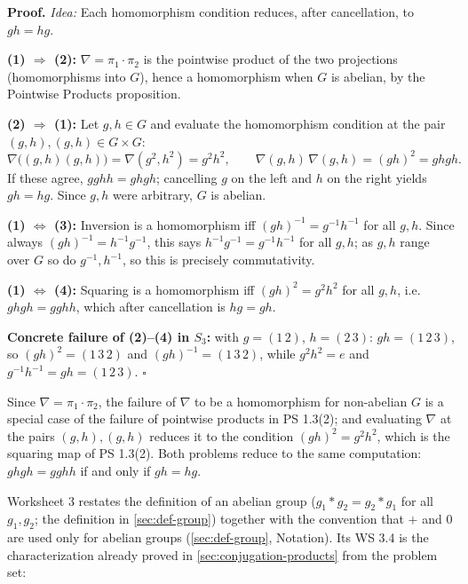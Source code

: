 \documentclass[11pt]{report}
\renewenvironment{proof}[1][Proof]{\noindent\textbf{#1.} }{\hfill$\square$\par\vspace{5pt}}
\begin{document}
\begin{proof}
\textit{Idea:} Each homomorphism condition reduces, after cancellation, to $gh = hg$.\par
\textbf{(1) $\Rightarrow$ (2):} $\nabla = \pi_1 \cdot \pi_2$ is the pointwise product of the two projections (homomorphisms into $G$), hence a homomorphism when $G$ is abelian, by the Pointwise Products proposition.

\textbf{(2) $\Rightarrow$ (1):} Let $g, h \in G$ and evaluate the homomorphism condition at the pair $(g, h), (g, h) \in G \times G$:
\[ \nabla\big((g,h)(g,h)\big) = \nabla(g^2, h^2) = g^2 h^2, \qquad \nabla(g,h)\,\nabla(g,h) = (gh)^2 = ghgh. \]
If these agree, $gghh = ghgh$; cancelling $g$ on the left and $h$ on the right yields $gh = hg$. Since $g, h$ were arbitrary, $G$ is abelian.

\textbf{(1) $\Leftrightarrow$ (3):} Inversion is a homomorphism iff $(gh)^{-1} = g^{-1} h^{-1}$ for all $g, h$. Since always $(gh)^{-1} = h^{-1} g^{-1}$, this says $h^{-1} g^{-1} = g^{-1} h^{-1}$ for all $g, h$; as $g, h$ range over $G$ so do $g^{-1}, h^{-1}$, so this is precisely commutativity.

\textbf{(1) $\Leftrightarrow$ (4):} Squaring is a homomorphism iff $(gh)^2 = g^2 h^2$ for all $g, h$, i.e.\ $ghgh = gghh$, which after cancellation is $hg = gh$.

\textbf{Concrete failure of (2)--(4) in $S_3$:} with $g = (1\,2)$, $h = (2\,3)$: $gh = (1\,2\,3)$, so $(gh)^2 = (1\,3\,2)$ and $(gh)^{-1} = (1\,3\,2)$, while $g^2h^2 = e$ and $g^{-1}h^{-1} = gh = (1\,2\,3)$.
\end{proof}

\begin{rembox}\label{rem:relation-between-ps-1-3-2-ps-1-4-3}
Since $\nabla = \pi_1 \cdot \pi_2$, the failure of $\nabla$ to be a homomorphism for non-abelian $G$ is a special case of the failure of pointwise products in PS 1.3(2); and evaluating $\nabla$ at the pairs $(g,h), (g,h)$ reduces it to the condition $(gh)^2 = g^2 h^2$, which is the squaring map of PS 1.3(2). Both problems reduce to the same computation: $ghgh = gghh$ if and only if $gh = hg$.
\end{rembox}


Worksheet 3 restates the definition of an abelian group ($g_1 * g_2 = g_2 * g_1$ for all $g_1, g_2$; the definition in \ref{sec:def-group}) together with the convention that $+$ and $0$ are used only for abelian groups (\ref{sec:def-group}, Notation). Its WS 3.4 is the characterization already proved in \ref{sec:conjugation-products} from the problem set:
\end{document}
